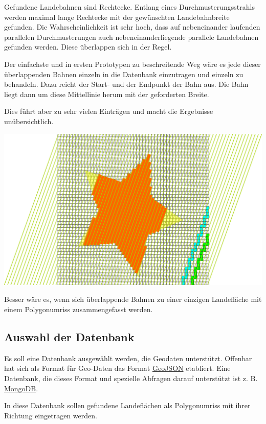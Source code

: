 \documentclass[
11pt, %
a4paper, %
oneside, %
pdfspacing, %
headinclude,
BCOR5mm, %
ngerman, %
bibtotocnumbered,
]{scrartcl}
\begin{document}
Gefundene Landebahnen sind Rechtecke. Entlang eines Durchmusterungsstrahls werden maximal lange Rechtecke mit der gewünschten Landebahnbreite gefunden. Die Wahrscheinlichkeit ist sehr hoch, dass auf nebeneinander laufenden parallelen Durchmusterungen auch nebeneinanderliegende parallele Landebahnen gefunden werden. Diese überlappen sich in der Regel. 

Der einfachste und in ersten Prototypen zu beschreitende Weg wäre es jede dieser überlappenden Bahnen einzeln in die Datenbank einzutragen und einzeln zu behandeln. Dazu reicht der Start- und der Endpunkt der Bahn aus. Die Bahn liegt dann um diese Mittellinie herum mit der geforderten Breite.

Dies führt aber zu sehr vielen Einträgen und macht die Ergebnisse unübersichtlich.

\includegraphics[width=\textwidth]{./drawings/ueberlappendeBahnen.png}

Besser wäre es, wenn sich überlappende Bahnen zu einer einzigen Landefläche mit einem Polygonumriss zusammengefasst werden. 

\subsection{Auswahl der Datenbank}

Es soll eine Datenbank ausgewählt werden, die Geodaten unterstützt. Offenbar hat sich als Format für Geo-Daten das Format \href{http://geojson.org/}{GeoJSON} etabliert. Eine Datenbank, die dieses Format und spezielle Abfragen darauf unterstützt ist z. B. \href{https://docs.mongodb.com/}{MongoDB}.

In diese Datenbank sollen gefundene Landeflächen als Polygonumriss mit ihrer Richtung eingetragen werden.
\end{document}
